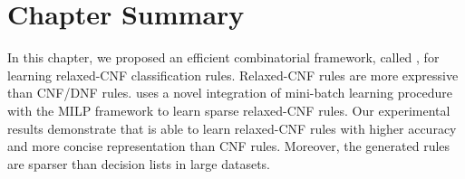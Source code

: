 \section{Chapter Summary}
\label{interpretability_crr_sec:conclusion}

In this chapter, we proposed an efficient combinatorial framework, called {\crr}, for learning relaxed-CNF  classification rules. Relaxed-CNF rules are  more expressive  than CNF/DNF rules.  {\crr}  uses a novel integration of mini-batch learning procedure with the MILP framework to learn sparse relaxed-CNF rules. Our experimental results demonstrate that {\crr} is able to learn relaxed-CNF  rules with higher accuracy and more concise representation than CNF rules. Moreover, the generated rules are sparser than decision lists in large datasets. 